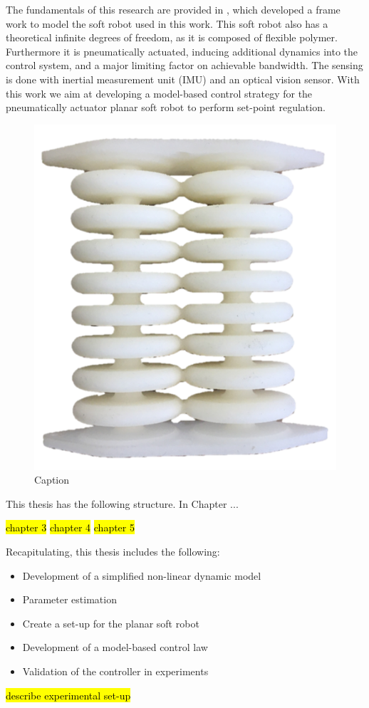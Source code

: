 The fundamentals of this research are provided in  \cite{Caasenbrood2020}, which developed a frame work to model the soft robot used in this work. This soft robot also has a theoretical infinite degrees of freedom, as it is composed of flexible polymer. Furthermore it is pneumatically actuated, inducing additional dynamics into the control system, and a major limiting factor on achievable bandwidth. The sensing is done with inertial measurement unit (IMU) and an optical vision sensor. With this work we aim at developing a model-based control strategy for the pneumatically actuator planar soft robot to perform set-point regulation. 



\begin{figure}[H]
    \centering
    \includegraphics[width = 
   0.45 \textwidth]{Figures/Chapter1/actuator.png}
    \caption{Caption}
    \label{fig1:actuator}
\end{figure}
This thesis has the following structure. In Chapter ...

\hl{chapter 3}
\hl{chapter 4}
\hl{chapter 5}


Recapitulating, this thesis includes the following:


\begin{itemize}
    \item Development of a simplified non-linear dynamic model
    \item Parameter estimation
    \item Create a set-up for the planar soft robot 
    \item Development of a model-based control law
    \item Validation of the controller in experiments
\end{itemize}

\hl{describe experimental set-up}